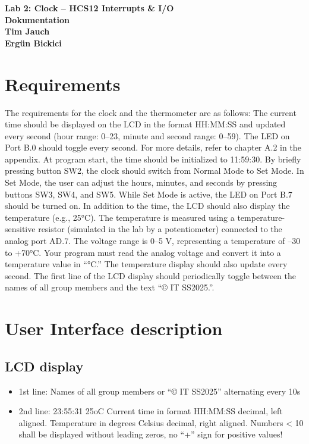 \documentclass[a4paper,12pt]{article}
\begin{document}
\thispagestyle{empty}
\vspace*{3cm}
\begin{center}
    \textbf{\LARGE{Lab 2: Clock – HCS12 Interrupts \& I/O}}\\[1cm]
    \textbf{\LARGE{Dokumentation}}\\[3cm]
    \textbf{Tim Jauch}\\[0.5cm]
    \textbf{Ergün Bickici}
\end{center}

\newpage

\tableofcontents
\newpage

\section{Requirements}
The requirements for the clock and the thermometer are as follows:
The current time should be displayed on the LCD in the format HH:MM:SS and updated every second (hour range: 0–23, minute and second range: 0–59). The LED on Port B.0 should toggle every second. For more details, refer to chapter A.2 in the appendix.
At program start, the time should be initialized to 11:59:30. By briefly pressing button SW2, the clock should switch from Normal Mode to Set Mode. In Set Mode, the user can adjust the hours, minutes, and seconds by pressing buttons SW3, SW4, and SW5. While Set Mode is active, the LED on Port B.7 should be turned on.
In addition to the time, the LCD should also display the temperature (e.g., 25°C). The temperature is measured using a temperature-sensitive resistor (simulated in the lab by a potentiometer) connected to the analog port AD.7. The voltage range is 0–5 V, representing a temperature of –30 to +70°C. Your program must read the analog voltage and convert it into a temperature value in “°C.” The temperature display should also update every second.
The first line of the LCD display should periodically toggle between the names of all group members and the text “© IT SS2025.”.

\newpage
\section{User Interface description}
\subsection{LCD display}
\begin{itemize}
  \item 1st line: Names of all group members or “© IT SS2025” alternating every 10s
  \item 2nd line: 23:55:31 25oC Current time in format HH:MM:SS decimal, left aligned.
  Temperature in degrees Celsius decimal, right aligned. Numbers < 10 shall be displayed
  without leading zeros, no “+” sign for positive values!
\end{itemize}
\end{document}
